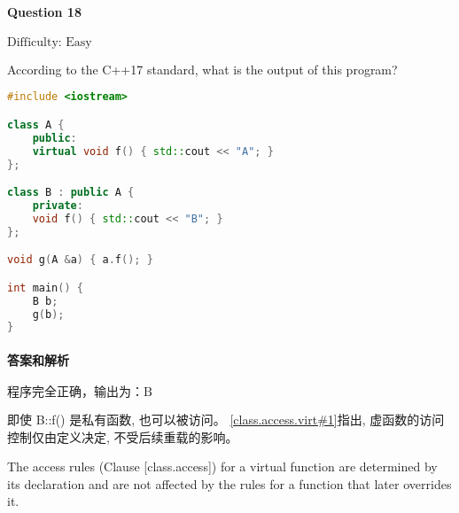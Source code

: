 \documentclass{article}
\begin{document}
	\paragraph*{Question 18} $\boxed{\text{Difficulty: Easy}} $			
	
	According to the C++17 standard, what is the output of this program?
	
	\begin{lstlisting}[language=C++]  		
#include <iostream>

class A {
	public:
	virtual void f() { std::cout << "A"; }
};

class B : public A {
	private:
	void f() { std::cout << "B"; }
};

void g(A &a) { a.f(); }

int main() {
	B b;
	g(b);
}
	\end{lstlisting}
	
	\paragraph*{答案和解析} $\boxed{\text{程序完全正确，输出为：B}} $
	
	即使 B::f() 是私有函数, 也可以被访问。
	\href{https://timsong-cpp.github.io/cppwp/n4659/class.access.virt#1}{[class.access.virt\#1]}指出, 虚函数的访问控制仅由定义决定, 不受后续重载的影响。
	
	\begin{lightgrayleftbar}
		The access rules (Clause [class.access]) for a virtual function are determined by its declaration and are not affected by the rules for a function that later overrides it.
	\end{lightgrayleftbar}
	
	
\end{document}
